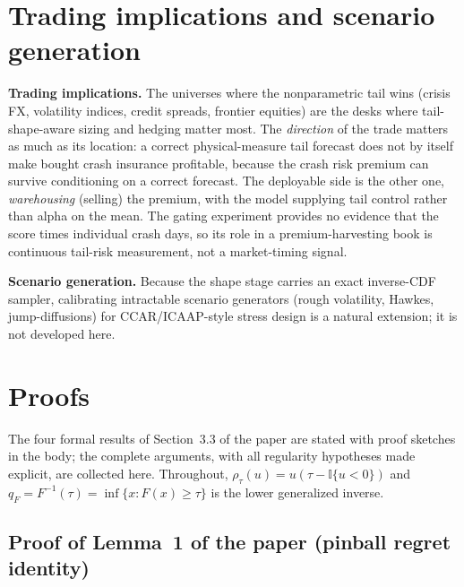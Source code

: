 \documentclass[11pt]{article}
\begin{document}
\section{Trading implications and scenario generation}
\textbf{Trading implications.} The universes where the nonparametric tail wins (crisis FX, volatility indices, credit spreads, frontier equities) are the desks where tail-shape-aware
sizing and hedging matter most. The \emph{direction} of the trade matters
as much as its location: a correct physical-measure tail forecast
does not by itself make bought crash insurance profitable, because the
crash risk premium can survive conditioning on a correct forecast.
The deployable side is the other one, \emph{warehousing} (selling) the premium, with the model supplying tail control rather than alpha on the mean. The
gating experiment provides no evidence that the score times individual
crash days, so its role in a premium-harvesting book is continuous
tail-risk measurement, not a market-timing signal.

\textbf{Scenario generation.} Because the shape stage carries an exact
inverse-CDF sampler, calibrating intractable scenario generators
(rough volatility, Hawkes, jump-diffusions) for CCAR/ICAAP-style
stress design is a natural extension; it is not developed here.



\clearpage
\section{Proofs}\label{app:proofs}

The four formal results of Section~3.3 of the paper are stated with
proof sketches in the body; the complete arguments, with all regularity
hypotheses made explicit, are collected here. Throughout, $\rho_\tau(u)
= u(\tau - \mathbb{I}\{u<0\})$ and $q_F = F^{-1}(\tau) = \inf\{x:F(x)\ge
\tau\}$ is the lower generalized inverse.

\subsection*{Proof of Lemma~1 of the paper (pinball regret identity)}
\end{document}
